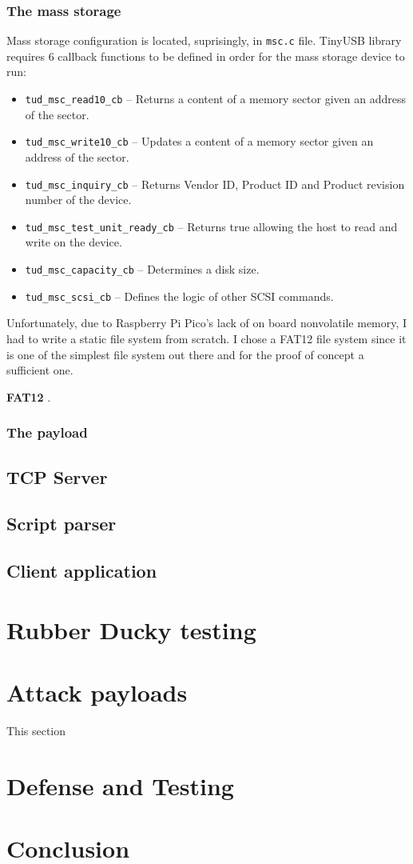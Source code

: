 \subsection{The mass storage}
Mass storage configuration is located, suprisingly, in \verb|msc.c| file. TinyUSB library requires 6 callback functions to be defined in order for the mass storage device to run:
\begin{itemize}
    \item \verb|tud_msc_read10_cb| -- Returns a content of a memory sector given an address of the sector.
    \item \verb|tud_msc_write10_cb| -- Updates a content of a memory sector given an address of the sector.
    \item \verb|tud_msc_inquiry_cb| -- Returns Vendor ID, Product ID and Product revision number of the device.
    \item \verb|tud_msc_test_unit_ready_cb| -- Returns true allowing the host to read and write on the device.
    \item \verb|tud_msc_capacity_cb| -- Determines a disk size.
    \item \verb|tud_msc_scsi_cb| -- Defines the logic of other SCSI commands.
\end{itemize}
Unfortunately, due to Raspberry Pi Pico's lack of on board nonvolatile memory, I had to write a static file system from scratch. I chose a FAT12 file system since it is one of the simplest file system out there and for the proof of concept a sufficient one.

\textbf{FAT12} .

\subsection{The payload}

\section{TCP Server}

\section{Script parser}

\section{Client application}

\chapter{Rubber Ducky testing}
\label{practicalTest}

\chapter{Attack payloads}
\label{attackPayloads}
This section 

\chapter{Defense and Testing}
\label{defense}

\chapter{Conclusion}
\label{conclusion}
